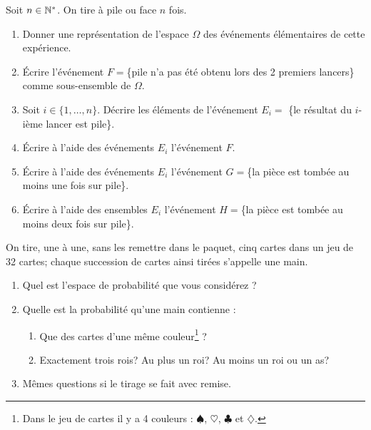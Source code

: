 \documentclass[a4paper,11pt,reqno]{amsart}
\begin{document}
\begin{exo}

    Soit $n\in \mathbb{N}^*$. On tire à pile ou face $n$ fois.

    \begin{enumerate}
      \item Donner une représentation  de l'espace $\Omega$ des événements
      élémentaires de cette expérience.

      \item Écrire l'événement $F=$\{pile n'a pas été obtenu lors
      des 2 premiers lancers\} comme sous-ensemble de $\Omega$.

      \item Soit $i\in \{1,\ldots,n\}$.
      Décrire les éléments de l'événement $E_i=$
      \{le résultat du $i$-ième lancer est pile\}.

      \item Écrire à l'aide des événements $E_i$ l'événement $F$.

      \item Écrire à l'aide des événements $E_i$ l'événement
      $G=$\{la pièce est tombée au moins une fois sur pile\}.

      \item Écrire à l'aide des ensembles $E_i$ l'événement
      $H=$\{la pièce est tombée au moins deux fois sur pile\}.
    \end{enumerate}

\end{exo}


\begin{exo}

  On tire, une à une, sans les remettre dans le paquet, cinq cartes dans un jeu de 32 cartes; chaque succession de cartes  ainsi tirées s'appelle une main.
  \begin{enumerate}
    \item Quel est l'espace de probabilité que vous considérez ?
    \item Quelle est la probabilité qu'une main  contienne :
    \begin{enumerate}
      \item Que des cartes d'une même couleur\footnote{Dans le jeu de cartes il y a 4 couleurs : $\spadesuit$, $\heartsuit$, $\clubsuit$ et $\diamondsuit$.} ?
      \item Exactement trois rois? Au plus un roi? Au moins un roi ou un as?
    \end{enumerate}
    \item Mêmes questions si le tirage se fait avec remise.
  \end{enumerate}
\end{exo}
\end{document}
